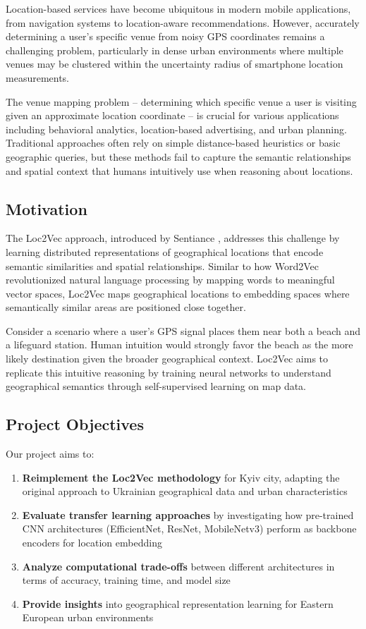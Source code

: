 Location-based services have become ubiquitous in modern mobile applications, from navigation systems to location-aware recommendations. However, accurately determining a user's specific venue from noisy GPS coordinates remains a challenging problem, particularly in dense urban environments where multiple venues may be clustered within the uncertainty radius of smartphone location measurements.

The venue mapping problem -- determining which specific venue a user is visiting given an approximate location coordinate -- is crucial for various applications including behavioral analytics, location-based advertising, and urban planning. Traditional approaches often rely on simple distance-based heuristics or basic geographic queries, but these methods fail to capture the semantic relationships and spatial context that humans intuitively use when reasoning about locations.

\subsection{Motivation}

The Loc2Vec approach, introduced by Sentiance \cite{sentiance2018}, addresses this challenge by learning distributed representations of geographical locations that encode semantic similarities and spatial relationships. Similar to how Word2Vec revolutionized natural language processing by mapping words to meaningful vector spaces, Loc2Vec maps geographical locations to embedding spaces where semantically similar areas are positioned close together.

Consider a scenario where a user's GPS signal places them near both a beach and a lifeguard station. Human intuition would strongly favor the beach as the more likely destination given the broader geographical context. Loc2Vec aims to replicate this intuitive reasoning by training neural networks to understand geographical semantics through self-supervised learning on map data.

\subsection{Project Objectives}

Our project aims to:

\begin{enumerate}
    \item \textbf{Reimplement the Loc2Vec methodology} for Kyiv city, adapting the original approach to Ukrainian geographical data and urban characteristics
    \item \textbf{Evaluate transfer learning approaches} by investigating how pre-trained CNN architectures (EfficientNet, ResNet, MobileNetv3) perform as backbone encoders for location embedding
    \item \textbf{Analyze computational trade-offs} between different architectures in terms of accuracy, training time, and model size
    \item \textbf{Provide insights} into geographical representation learning for Eastern European urban environments
\end{enumerate}


